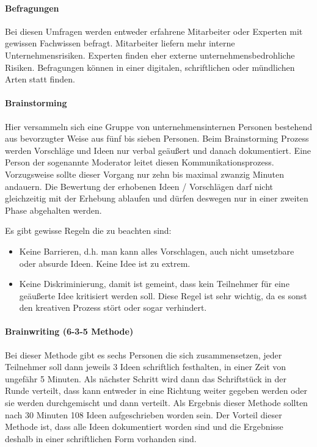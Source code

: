 \paragraph{Befragungen}
Bei diesen Umfragen werden entweder erfahrene Mitarbeiter oder Experten mit gewissen Fachwissen befragt. Mitarbeiter liefern mehr interne Unternehmensrisiken. Experten finden eher externe unternehmensbedrohliche Risiken. Befragungen können in einer digitalen, schriftlichen oder mündlichen Arten statt finden.

\paragraph{Brainstorming}
Hier versammeln sich eine Gruppe von unternehmensinternen Personen bestehend aus bevorzugter Weise aus fünf bis sieben Personen. 
Beim Brainstorming Prozess werden Vorschläge und Ideen nur verbal geäußert und danach dokumentiert. Eine Person der sogenannte Moderator leitet diesen Kommunikationsprozess. Vorzugsweise sollte dieser Vorgang nur zehn bis maximal zwanzig Minuten andauern.
Die Bewertung der erhobenen Ideen / Vorschlägen darf nicht gleichzeitig mit der Erhebung ablaufen und dürfen deswegen nur in einer zweiten Phase abgehalten werden.

Es gibt gewisse Regeln die zu beachten sind:
\begin{itemize}
	\item Keine Barrieren, d.h. man kann alles Vorschlagen, auch nicht umsetzbare oder absurde Ideen. Keine Idee ist zu extrem.
	\item Keine Diskriminierung, damit ist gemeint, dass kein Teilnehmer für eine geäußerte Idee kritisiert werden soll. Diese Regel ist sehr wichtig, da es sonst den kreativen Prozess stört oder sogar verhindert.
\end{itemize}

\paragraph{Brainwriting (6-3-5 Methode)}
Bei dieser Methode gibt es sechs Personen die sich zusammensetzen, jeder Teilnehmer soll dann jeweils 3 Ideen schriftlich festhalten, in einer Zeit von ungefähr 5 Minuten.
Als nächster Schritt wird dann das Schriftstück in der Runde verteilt, dass kann entweder in eine Richtung weiter gegeben werden oder sie werden durchgemischt und dann verteilt. 
Als Ergebnis dieser Methode sollten nach 30 Minuten 108 Ideen aufgeschrieben worden sein.
Der Vorteil dieser Methode ist, dass alle Ideen dokumentiert worden sind und die Ergebnisse deshalb in einer schriftlichen Form vorhanden sind.

